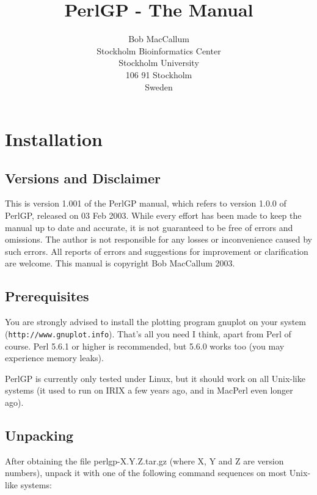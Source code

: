 \documentclass[a4paper]{article}
\begin{document}
\title{PerlGP - The Manual}

\author{Bob MacCallum\\
Stockholm Bioinformatics Center\\
Stockholm University\\
106 91 Stockholm\\
Sweden}

\maketitle

\tableofcontents

\section{Installation}

\subsection{Versions and Disclaimer}

This is version 1.001 of the PerlGP manual, which refers to version
1.0.0 of PerlGP, released on 03 Feb 2003.  While every effort has been
made to keep the manual up to date and accurate, it is not guaranteed
to be free of errors and omissions.  The author is not responsible for
any losses or inconvenience caused by such errors.  All reports of
errors and suggestions for improvement or clarification are welcome.
This manual is copyright Bob MacCallum 2003.

\subsection{Prerequisites}\label{foo}

You are strongly advised to install the plotting program gnuplot on
your system (\texttt{http://www.gnuplot.info}).  That's all you need I
think, apart from Perl of course.  Perl 5.6.1 or higher is
recommended, but 5.6.0 works too (you may experience memory leaks).

PerlGP is currently only tested under Linux, but it should work on all
Unix-like systems (it used to run on IRIX a few years ago, and in
MacPerl even longer ago).

\subsection{Unpacking}

After obtaining the file perlgp-X.Y.Z.tar.gz (where X, Y and Z are
version numbers), unpack it with one of the following command
sequences on most Unix-like systems:
\end{document}
